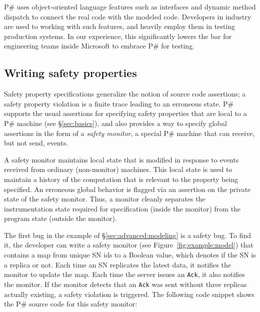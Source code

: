 \documentclass{llncs}
\newcommand{\ps}{P\#\xspace}
\begin{document}
\ps uses object-oriented language features such as interfaces and dynamic method dispatch to connect the real code with the modeled code. Developers in industry are used to working with such features, and heavily employ them in testing production systems. In our experience, this significantly lowers the bar for engineering teams inside Microsoft to embrace \ps for testing.

\subsection{Writing safety properties}
\label{sec:advanced:safety}

Safety property specifications generalize the notion of source code assertions; a safety property violation is a finite trace leading to an erroneous state. \ps supports the usual assertions for specifying safety properties that are local to a \ps machine (see \S\ref{sec:basics}), and also provides a way to specify global assertions in the form of a \emph{safety monitor}, a special \ps machine that can receive, but not send, events.

A safety monitor maintains local state that is modified in response to events received from ordinary (non-monitor) machines. This local state is used to maintain a history of the computation that is relevant to the property being specified. An erroneous global behavior is flagged via an assertion on the private state of the safety monitor. Thus, a monitor cleanly separates the instrumentation state required for specification (inside the monitor) from the program state (outside the monitor).

The first bug in the example of \S\ref{sec:advanced:modeling} is a safety bug. To find it, the developer can write a safety monitor (see Figure~\ref{fig:example:model}) that contains a map from unique SN ids to a Boolean value, which denotes if the SN is a replica or not. Each time an SN replicates the latest data, it notifies the monitor to update the map. Each time the server issues an \texttt{Ack}, it also notifies the monitor. If the monitor detects that an \texttt{Ack} was sent without three replicas actually existing, a safety violation is triggered. The following code snippet shows the \ps source code for this safety monitor:
\end{document}
